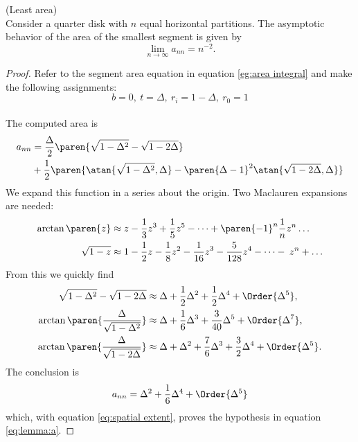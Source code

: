 \begin{Lemma}(Least area)\\
Consider a quarter disk with $n$ equal horizontal partitions. The asymptotic behavior of the area of the smallest segment is given by
%
\begin{equation}
  \lim_{n\to\infty} a_{nn} = n^{-2}.
\end{equation}
\end{Lemma}
%
\begin{proof}
Refer to the segment area equation in equation \eqref{eg:area integral} and make the following assignments:
$$b = 0, \ t = \Delta, \ r_{i} = 1 - \Delta, \ r_{0} = 1$$ \\
The computed area is
\begin{equation}
\begin{split}
  a_{nn} 
  & = \frac{\Delta}{2} \paren{\sqrt{1-\Delta^{2}} - \sqrt{1 - 2\Delta}  } \\
  & + \frac{1}{2} \paren{\atan{\sqrt{1-\Delta^{2}},\Delta} - \paren{\Delta-1}^{2}\atan{\sqrt{1-2\Delta},\Delta}}
  \label{eq:lemma:a}
\end{split}
%
\end{equation}
We expand this function in a series about the origin. Two Maclauren expansions are needed:
\begin{equation}
  \begin{split}
    \arctan\paren{z} 
      & \approx z - \frac{1}{3}z^{3} + \frac{1}{5}z^{5} - \dots + \paren{-1}^{n}\frac{1}{n}z^{n} \dots \\
    \sqrt{1-z} 
      & \approx 1 - \frac{1}{2}z - \frac{1}{8}z^{2} - \frac{1}{16}z^{3} - \frac{5}{128}z^{4} - \dots - \frac{}{} z^{n} + \dots
  \end{split}
\end{equation}
%
From this we quickly find
%
\begin{equation}
  \begin{split}
    \sqrt{1 - \Delta^{2}} - \sqrt{1 - 2\Delta}
      &\approx \Delta + \frac{1}{2} \Delta^{2} + \frac{1}{2} \Delta^{4} + \Order{\Delta^{5}}, \\
    \arctan{ \paren{\frac{\Delta} {\sqrt{1 - \Delta^{2}}}} }
      &\approx \Delta + \frac{1}{6} \Delta^{3} + \frac{3}{40} \Delta^{5} + \Order{\Delta^{7}}, \\
    \arctan{ \paren{\frac{\Delta} {\sqrt{1 - 2\Delta}}} }
      &\approx \Delta + \Delta^{2} + \frac{7}{6} \Delta^{3} + \frac{3}{2}\Delta^{4} + \Order{\Delta^{5}}.
  \end{split}
\end{equation}
%
The conclusion is
%
\begin{equation}
  a_{nn} = \Delta^{2} + \frac{1}{6} \Delta^{4} + \Order{\Delta^{5}}
\end{equation}
%
which, with equation \eqref{eq:spatial extent}, proves the hypothesis in equation \eqref{eq:lemma:a}.
\end{proof}


\endinput %